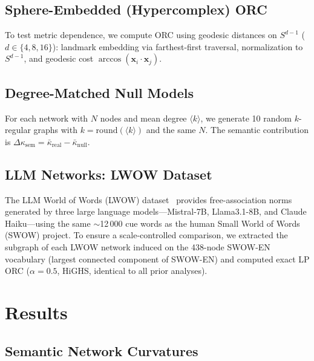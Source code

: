 \documentclass[11pt,a4paper]{article}
\newcommand{\kbar}{\bar{\kappa}}
\newcommand{\kavg}{\langle k \rangle}
\newcommand{\Dksem}{\Delta\kappa_{\text{sem}}}
\begin{document}
\subsection{Sphere-Embedded (Hypercomplex) ORC}

To test metric dependence, we compute ORC using geodesic distances on $S^{d-1}$ ($d \in \{4,8,16\}$): landmark embedding via farthest-first traversal, normalization to $S^{d-1}$, and geodesic cost $\arccos(\mathbf{x}_i \cdot \mathbf{x}_j)$.

\subsection{Degree-Matched Null Models}

For each network with $N$ nodes and mean degree $\kavg$, we generate 10 random $k$-regular graphs with $k = \mathrm{round}(\kavg)$ and the same $N$. The semantic contribution is $\Dksem = \kbar_{\mathrm{real}} - \kbar_{\mathrm{null}}$.

\subsection{LLM Networks: LWOW Dataset}

The LLM World of Words (LWOW) dataset~\cite{chankhanna2025worldofwords} provides free-association norms generated by three large language models---Mistral-7B, Llama3.1-8B, and Claude Haiku---using the same $\sim$12\,000 cue words as the human Small World of Words (SWOW) project. To ensure a scale-controlled comparison, we extracted the subgraph of each LWOW network induced on the 438-node SWOW-EN vocabulary (largest connected component of SWOW-EN) and computed exact LP ORC ($\alpha=0.5$, HiGHS, identical to all prior analyses).


\section{Results}
\label{sec:results}

\subsection{Semantic Network Curvatures}
\end{document}
